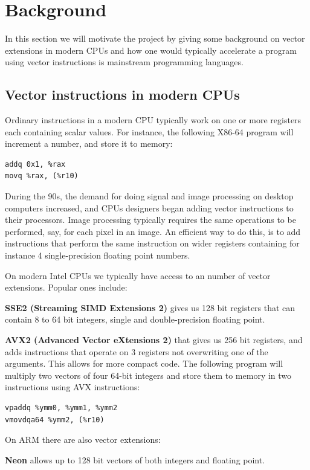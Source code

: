 \documentclass{article}
\begin{document}
\section{Background}

In this section we will motivate the project by giving some background on vector extensions in modern CPUs and how one would typically accelerate a program using vector instructions is mainstream programming languages.

\subsection{Vector instructions in modern CPUs}

Ordinary instructions in a modern CPU typically work on one or more registers each containing scalar values. For instance, the following X86-64 program will increment a number, and store it to memory:
\begin{verbatim}
addq 0x1, %rax
movq %rax, (%r10)
\end{verbatim}
During the 90s, the demand for doing signal and image processing on desktop computers increased, and CPUs designers began adding vector instructions to their processors. Image processing typically requires the same operations to be performed, say, for each pixel in an image. An efficient way to do this, is to add instructions that perform the same instruction on wider registers containing for instance 4 single-precision floating point numbers.

On modern Intel CPUs we typically have access to an number of vector extensions. Popular ones include:

\textbf{SSE2 (Streaming SIMD Extensions 2)} gives us 128 bit registers that can contain 8 to 64 bit integers, single and double-precision floating point.

\textbf{AVX2 (Advanced Vector eXtensions 2)}
that gives us 256 bit registers, and adds instructions that operate on 3 registers not overwriting one of the arguments. This allows for more compact code. The following program will multiply two vectors of four 64-bit integers and store them to memory in two instructions using AVX instructions:
\begin{verbatim}
vpaddq %ymm0, %ymm1, %ymm2
vmovdqa64 %ymm2, (%r10)
\end{verbatim}

On ARM there are also vector extensions:

\textbf{Neon}
allows up to 128 bit vectors of both integers and floating point.
\end{document}
